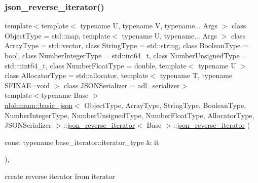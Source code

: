 \subsubsection{\texorpdfstring{json\+\_\+reverse\+\_\+iterator()}{json\_reverse\_iterator()}\hspace{0.1cm}{\footnotesize\ttfamily [1/2]}}
{\footnotesize\ttfamily template$<$template$<$ typename U, typename V, typename... Args $>$ class Object\+Type = std\+::map, template$<$ typename U, typename... Args $>$ class Array\+Type = std\+::vector, class String\+Type  = std\+::string, class Boolean\+Type  = bool, class Number\+Integer\+Type  = std\+::int64\+\_\+t, class Number\+Unsigned\+Type  = std\+::uint64\+\_\+t, class Number\+Float\+Type  = double, template$<$ typename U $>$ class Allocator\+Type = std\+::allocator, template$<$ typename T, typename S\+F\+I\+N\+A\+E=void $>$ class J\+S\+O\+N\+Serializer = adl\+\_\+serializer$>$ \\
template$<$typename Base $>$ \\
\hyperlink{classnlohmann_1_1basic__json}{nlohmann\+::basic\+\_\+json}$<$ Object\+Type, Array\+Type, String\+Type, Boolean\+Type, Number\+Integer\+Type, Number\+Unsigned\+Type, Number\+Float\+Type, Allocator\+Type, J\+S\+O\+N\+Serializer $>$\+::\hyperlink{classnlohmann_1_1basic__json_1_1json__reverse__iterator}{json\+\_\+reverse\+\_\+iterator}$<$ Base $>$\+::\hyperlink{classnlohmann_1_1basic__json_1_1json__reverse__iterator}{json\+\_\+reverse\+\_\+iterator} (\begin{DoxyParamCaption}\item[{const typename base\+\_\+iterator\+::iterator\+\_\+type \&}]{it }\end{DoxyParamCaption})\hspace{0.3cm}{\ttfamily [inline]}, {\ttfamily [noexcept]}}



create reverse iterator from iterator 

\mbox{\label{classnlohmann_1_1basic__json_1_1json__reverse__iterator_af04099cd32946ab37cfa6004ad5a7863}} 
